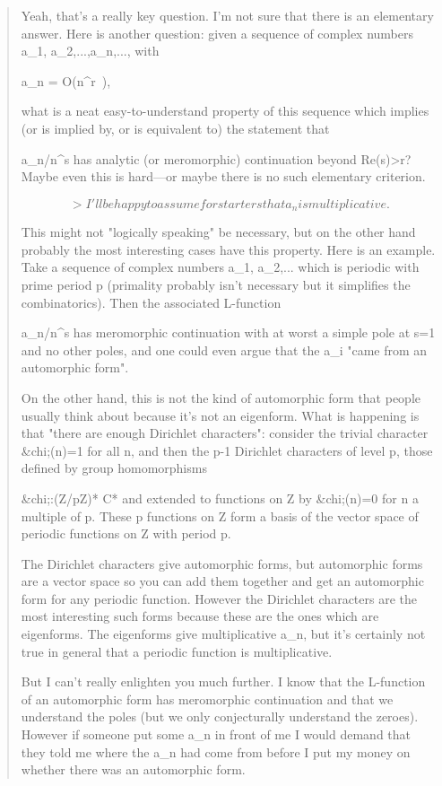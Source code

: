 \begin{quote}
 Yeah, that's a really key question. I'm not sure that there is an elementary
 answer.  Here is another question: given a sequence of complex numbers
 a_{1}, a_{2},...,a_{n},..., with 

a_{n} =
 O(n^{r\ }), 

 what is a neat easy-to-understand
 property of this sequence which implies (or is implied by, or is equivalent 
 to) the statement that 

\sum a_{n}/n^{s} 
has analytic (or meromorphic) continuation
 beyond Re(s)>r?  Maybe even this is hard---or maybe there is no such
 elementary criterion.


$$

 > I'll be happy to assume for starters that a_{n} is multiplicative.
$$
    

 This might not "logically speaking" be necessary, but on the other hand
 probably the most interesting cases have this property. Here is an
 example. Take a sequence of complex numbers a_{1}, 
 a_{2},... which
 is periodic with prime period p (primality probably isn't necessary but it
 simplifies the combinatorics). Then the associated L-function

 \sum a_{n}/n^{s}
 has
 meromorphic continuation with at worst a simple pole at s=1 and no
 other poles, and one could even argue that the a_{i} "came from an
 automorphic form".

 On the other hand, this is not the kind of automorphic form that
 people usually think about because it's not an eigenform. What is
 happening is that "there are enough Dirichlet characters": consider
 the trivial character &chi;(n)=1 for all n, and then the p-1 Dirichlet
 characters of level p, those defined by group homomorphisms 

&chi;:(Z/pZ)* \to  C*
 and extended to functions on Z by &chi;(n)=0 for n a multiple of p.
 These p functions on Z form a basis of the vector space of periodic functions
 on Z with period p.

 The Dirichlet characters give automorphic forms, but automorphic
 forms are a vector space so you can add them together and get
 an automorphic form for any periodic function. However the Dirichlet
 characters are the most interesting such forms because these are the ones
 which are eigenforms. The eigenforms give multiplicative a_{n}, but
 it's certainly not true in general that a periodic function is 
 multiplicative.
 
 But I can't really enlighten you much further. I know that the
 L-function of an automorphic form has meromorphic continuation
 and that we understand the poles (but we only conjecturally understand
 the zeroes). However if someone put some a_{n} in front of me I would
 demand that they told me where the a_{n} had come from before I put
 my money on whether there was an automorphic form.
 

\end{quote}
